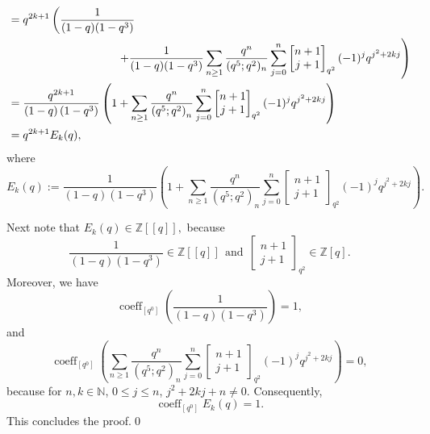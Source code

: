 \documentclass[12pt,reqno]{amsart}
\renewcommand{\(}{\left\(}
\renewcommand{\)}{\right\)}
\numberwithin{equation}{section}
\theoremstyle{plain}
\theoremstyle{definition}
\numberwithin{equation}{section}
\begin{document}
\begin{align*}
&=q^{2k+1}\left(\frac{1}{(1-q)(1-q^3)}\right.\nonumber\\
&\hspace{3.4cm}\left.+\frac{1}{(1-q)(1-q^3)}\sum_{n\ge 1}\frac{q^{n}}{(q^5;q^2)_{n}}\sum_{j=0}^{n}\begin{bmatrix}
n+1\\
j+1
\end{bmatrix}_{q^2}(-1)^{j} q^{j^2+2kj}\right)\nonumber\\
&=\frac{q^{2k+1}}{\left(1-q\right)\left(1-q^3\right)}\left(1+\sum_{n\ge 1}\frac{q^{n}}{\left(q^5;q^2\right)_{n}}\sum_{j=0}^{n}\begin{bmatrix}
n+1\\
j+1
\end{bmatrix}_{q^2}(-1)^{j} q^{j^2+2kj}\right)\nonumber\\
&=q^{2k+1}E_k(q),
\end{align*}
where
\[
E_k(q):=\frac{1}{\left(1-q\right)\left(1-q^3\right)}\left(1+\sum_{n\ge 1}\frac{q^{n}}{\left(q^5;q^2\right)_{n}}\sum_{j=0}^{n}\begin{bmatrix}
n+1\\
j+1
\end{bmatrix}_{q^2}(-1)^{j} q^{j^2+2kj}\right).
\]

Next note that
$
E_k(q)\in \mathbb{Z}[[q]],
$
because 
\[
\frac{1}{\left(1-q\right)\left(1-q^3\right)}\in \mathbb{Z}[[q]]\ \ \text{and}\ \ \begin{bmatrix}
n+1\\
j+1
\end{bmatrix}_{q^2}\in\mathbb{Z}[q].
\]
Moreover, we have
\[
\operatorname{coeff}_{\left[q^0\right]}\left(\frac{1}{\left(1-q\right)\left(1-q^3\right)}\right)=1, 
\]
and
\[
\operatorname{coeff}_{\left[q^0\right]}\left(\sum_{n\ge 1}\frac{q^{n}}{\left(q^5;q^2\right)_{n}}\sum_{j=0}^{n}\begin{bmatrix}
n+1\\
j+1
\end{bmatrix}_{q^2}(-1)^{j} q^{j^2+2kj}\right)=0,
\]
because for $n,k\in\mathbb{N}$, $0\le j\le n$, $j^2+2kj+n\neq 0$. Consequently,
\[
\operatorname{coeff}_{\left[q^0\right]}E_k(q)=1.
\]
This concludes the proof.\qed 


\end{document}
